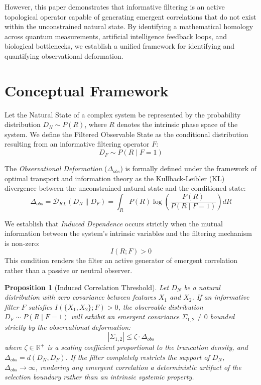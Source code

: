 \documentclass[11pt,twocolumn]{article}
\newtheorem{proposition}{Proposition}
\begin{document}
However, this paper demonstrates that informative filtering is an active topological operator capable of generating emergent correlations that do not exist within the unconstrained natural state. By identifying a mathematical homology across quantum measurements, artificial intelligence feedback loops, and biological bottlenecks, we establish a unified framework for identifying and quantifying observational deformation.

\section{Conceptual Framework}
Let the Natural State of a complex system be represented by the probability distribution $D_N \sim P(R)$, where $R$ denotes the intrinsic phase space of the system. We define the Filtered Observable State as the conditional distribution resulting from an informative filtering operator $F$:
\begin{equation}
D_F \sim P(R \mid F = 1)
\end{equation}

The \textit{Observational Deformation} ($\Delta_{obs}$) is formally defined under the framework of optimal transport and information theory as the Kullback-Leibler (KL) divergence between the unconstrained natural state and the conditioned state:
\begin{equation}
\Delta_{obs} = \mathcal{D}_{KL}(D_N \parallel D_F) = \int_{R} P(R) \log\left(\frac{P(R)}{P(R \mid F=1)}\right) dR
\end{equation}

We establish that \textit{Induced Dependence} occurs strictly when the mutual information between the system's intrinsic variables and the filtering mechanism is non-zero:
\begin{equation}
I(R;F) > 0
\end{equation}
This condition renders the filter an active generator of emergent correlation rather than a passive or neutral observer.

\begin{proposition}[Induced Correlation Threshold]
Let $D_{N}$ be a natural distribution with zero covariance between features $X_{1}$ and $X_{2}$. If an informative filter $F$ satisfies $I(\{X_1, X_2\}; F) > 0$, the observable distribution $D_{F} \sim P(R \mid F=1)$ will exhibit an emergent covariance $\Sigma_{1,2} \neq 0$ bounded strictly by the observational deformation:
\begin{equation}
|\Sigma_{1,2}| \leq \zeta \cdot \Delta_{obs}
\end{equation}
where $\zeta \in \mathbb{R}^+$ is a scaling coefficient proportional to the truncation density, and $\Delta_{obs} = d(D_N, D_F)$. If the filter completely restricts the support of $D_N$, $\Delta_{obs} \to \infty$, rendering any emergent correlation a deterministic artifact of the selection boundary rather than an intrinsic systemic property.
\end{proposition}
\end{document}

